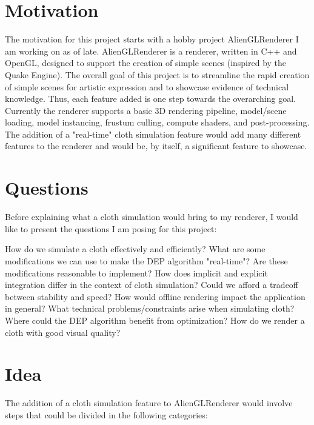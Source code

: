 \documentclass[letterpaper, 10 pt, conference, english]{ieeeconf}  %
\begin{document}
\section{Motivation}
The motivation for this project starts with a hobby project AlienGLRenderer I am working on as of late. AlienGLRenderer is a renderer, written in C++ and OpenGL, designed to support the creation of simple scenes (inspired by the Quake Engine). The overall goal of this project is to streamline the rapid creation of simple scenes for artistic expression and to showcase evidence of technical knowledge. Thus, each feature added is one step towards the overarching goal. Currently the renderer supports a basic 3D rendering pipeline, model/scene loading, model instancing, frustum culling, compute shaders, and post-processing. The addition of a "real-time" cloth simulation feature would add many different features to the renderer and would be, by itself, a significant feature to showcase.



\section{Questions}
Before explaining what a cloth simulation would bring to my renderer, I would like to present the questions I am posing for this project:
        \begin{outline}
                \1 How do we simulate a cloth effectively and efficiently?
                        \2 What are some modifications we can use to make the DEP algorithm "real-time"?
                                \3 Are these modifications reasonable to implement?
                        \2 How does implicit and explicit integration differ in the context of cloth simulation?
                                \3 Could we afford a tradeoff between stability and speed? 
                                \3 How would offline rendering impact the application in general?
                \1 What technical problems/constraints arise when simulating cloth?
                        \2 Where could the DEP algorithm benefit from optimization?
                        \2 How do we render a cloth with good visual quality?
        \end{outline}



\section{Idea}
The addition of a cloth simulation feature to AlienGLRenderer would involve steps that could be divided in the following categories:
\end{document}
